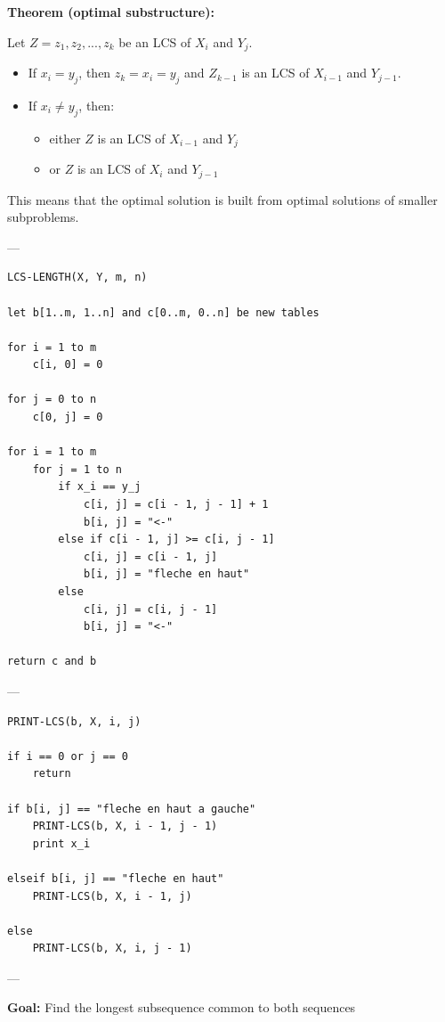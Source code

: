 \documentclass[11pt,a4paper,openany]{book}
\begin{document}
\textbf{Theorem (optimal substructure):}

Let $Z = z_1, z_2, ..., z_k$ be an LCS of $X_i$ and $Y_j$.

\begin{itemize}
    \item If $x_i = y_j$, then $z_k = x_i = y_j$ and $Z_{k-1}$ is an LCS of $X_{i-1}$ and $Y_{j-1}$.
    
    \item If $x_i \neq y_j$, then:
    \begin{itemize}
        \item either $Z$ is an LCS of $X_{i-1}$ and $Y_j$
        \item or $Z$ is an LCS of $X_i$ and $Y_{j-1}$
    \end{itemize}
\end{itemize}

This means that the optimal solution is built from optimal solutions of smaller subproblems.

---

\begin{lstlisting}
LCS-LENGTH(X, Y, m, n)

let b[1..m, 1..n] and c[0..m, 0..n] be new tables

for i = 1 to m
    c[i, 0] = 0

for j = 0 to n
    c[0, j] = 0

for i = 1 to m
    for j = 1 to n
        if x_i == y_j
            c[i, j] = c[i - 1, j - 1] + 1
            b[i, j] = "<-"
        else if c[i - 1, j] >= c[i, j - 1]
            c[i, j] = c[i - 1, j]
            b[i, j] = "fleche en haut"
        else
            c[i, j] = c[i, j - 1]
            b[i, j] = "<-"

return c and b
\end{lstlisting}

---

\begin{lstlisting}
PRINT-LCS(b, X, i, j)

if i == 0 or j == 0
    return

if b[i, j] == "fleche en haut a gauche"
    PRINT-LCS(b, X, i - 1, j - 1)
    print x_i

elseif b[i, j] == "fleche en haut"
    PRINT-LCS(b, X, i - 1, j)

else
    PRINT-LCS(b, X, i, j - 1)
\end{lstlisting}

---

\textbf{Goal:} Find the longest subsequence common to both sequences \\
\end{document}
